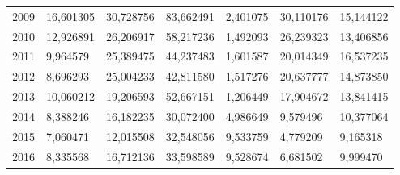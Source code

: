 \begin{table}
\begin{tabular}{p{1cm}p{2cm}p{2cm}p{2cm}p{2cm}p{2cm}p{2cm}}
 2009 &                              16,601305 &       30,728756 &                 83,662491 &                                    2,401075 &                  30,110176 &                           15,144122 \\
 2010 &                              12,926891 &       26,206917 &                 58,217236 &                                    1,492093 &                  26,239323 &                           13,406856 \\
 2011 &                               9,964579 &       25,389475 &                 44,237483 &                                    1,601587 &                  20,014349 &                           16,537235 \\
 2012 &                               8,696293 &       25,004233 &                 42,811580 &                                    1,517276 &                  20,637777 &                           14,873850 \\
 2013 &                              10,060212 &       19,206593 &                 52,667151 &                                    1,206449 &                  17,904672 &                           13,841415 \\
 2014 &                               8,388246 &       16,182235 &                 30,072400 &                                    4,986649 &                   9,579496 &                           10,377064 \\
 2015 &                               7,060471 &       12,015508 &                 32,548056 &                                    9,533759 &                   4,779209 &                            9,165318 \\
 2016 &                               8,335568 &       16,712136 &                 33,598589 &                                    9,528674 &                   6,681502 &                            9,999470 \\
\bottomrule
\end{tabular}
\end{table}
